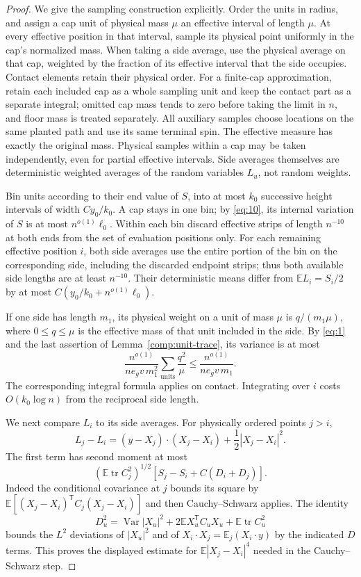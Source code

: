\begin{proof}
We give the sampling construction explicitly.  Order the units in
radius, and assign a cap unit of physical mass $\mu$ an effective
interval of length $\mu$.  At every effective position in that interval,
sample its physical point uniformly in the cap's normalized mass.
When taking a side average, use the physical average on that cap,
weighted by the fraction of its effective interval that the side
occupies.  Contact elements retain their physical order.  For a finite-cap approximation, retain each included cap as a whole
sampling unit and keep the contact part as a separate integral; omitted
cap mass tends to zero before taking the limit in $n$, and floor mass is
treated separately.  All auxiliary samples choose locations on the same
planted path and use its same terminal spin.
The effective measure has exactly the original mass.  Physical samples
within a cap may be taken independently, even for partial effective
intervals.  Side averages themselves are deterministic weighted
averages of the random variables $L_u$, not random weights.

Bin units according to their end value of $S$, into at most $k_0$
successive height intervals of width $Cy_0/k_0$.  A cap stays in one
bin; by \eqref{eq:10}, its internal variation of $S$ is at most
$n^{o(1)}\ell_0$.  Within each bin discard effective strips of length $n^{-10}$ at both
ends from the set of evaluation positions only.  For each remaining
effective position $i$, both side averages use the entire portion of the
bin on the corresponding side, including the discarded endpoint strips;
thus both available side lengths are at least $n^{-10}$.
Their deterministic means differ from $\mathbb EL_i=S_i/2$ by at most
$C(y_0/k_0+n^{o(1)}\ell_0)$.

If one side has length $m_1$, its physical weight on a unit of mass
$\mu$ is $q/(m_1\mu)$, where $0\le q\le\mu$ is the effective mass
of that unit included in the side.  By \eqref{eq:1} and the last
assertion of Lemma~\ref{comp:unit-trace}, its variance is at most
\[
 \frac{n^{o(1)}}{ne_gv\,m_1^2}
       \sum_{\mathrm{units}}\frac{q^2}{\mu}
 \le\frac{n^{o(1)}}{ne_gv\,m_1}.
\]
The corresponding integral formula applies on contact.  Integrating
over $i$ costs $O(k_0\log n)$ from the reciprocal side length.

We next compare $L_i$ to its side averages.  For physically ordered
points $j>i$,
\[
 L_j-L_i=(y-X_j)\cdot(X_j-X_i)+\frac12|X_j-X_i|^2.
\]
The first term has second moment at most
\[
 (\mathbb E\operatorname{tr}C_j^2)^{1/2}
       [S_j-S_i+C(D_i+D_j)].
\]
Indeed the conditional covariance at $j$ bounds its square by
$\mathbb E[(X_j-X_i)^{\mathsf T}C_j(X_j-X_i)]$ and then
Cauchy--Schwarz applies.  The identity
\[
 D_u^2=\operatorname{Var}|X_u|^2
       +2\mathbb E X_u^{\mathsf T}C_uX_u
       +\mathbb E\operatorname{tr}C_u^2
\]
bounds the $L^2$ deviations of $|X_u|^2$ and of
$X_i\cdot X_j=\mathbb E_j(X_i\cdot y)$ by the indicated $D$ terms.
This proves the displayed estimate for $\mathbb E|X_j-X_i|^4$ needed
in the Cauchy--Schwarz step.


\end{proof}
